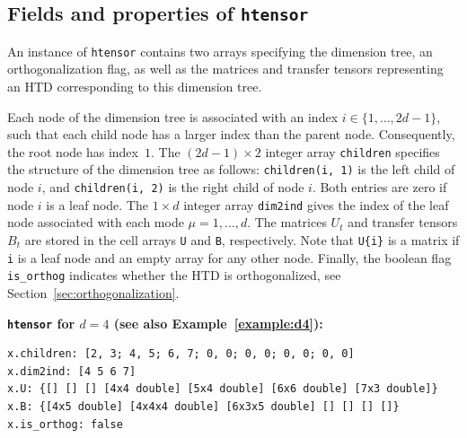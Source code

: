 \documentclass[11pt, a4paper]{article}
\begin{document}
\subsection{Fields and properties of {\tt htensor}} \label{sec:classhtensor}

An instance of {\tt htensor} contains two arrays specifying the dimension tree, an orthogonalization flag,
as well as the matrices and transfer tensors representing an HTD corresponding to
this dimension tree.

Each node of the dimension tree is associated with an index $i \in \{1,\ldots,2d-1\}$, such that each child node 
has a larger index than the parent node.
Consequently, the root node has index~$1$. The $(2d-1)\times 2$ integer array {\tt children}
specifies the structure of the dimension tree as follows: \texttt{children(i, 1)} is the left child of node $i$, and
\texttt{children(i, 2)} is the right child of node $i$. Both entries are zero if node $i$ is a leaf node.
The $1 \times d$ integer array \texttt{dim2ind} gives the index
of the leaf node associated with each mode $\mu=1, \ldots, d$.
The matrices $U_t$ and transfer tensors $B_t$ are stored in the cell
arrays \texttt{U} and \texttt{B}, respectively. Note that \texttt{U\{i\}} is a matrix if
\texttt{i} is a leaf node and an empty array for any other node.
Finally, the boolean flag \texttt{is\_orthog} indicates whether the HTD is
orthogonalized, see Section~\ref{sec:orthogonalization}.
%
\begin{framed}\noindent
\textbf{\texttt{htensor} for $d = 4$ (see also Example~\ref{example:d4}):}\\
\vspace{-3ex} 
\begin{verbatim}
x.children: [2, 3; 4, 5; 6, 7; 0, 0; 0, 0; 0, 0; 0, 0]
x.dim2ind: [4 5 6 7]
x.U: {[] [] [] [4x4 double] [5x4 double] [6x6 double] [7x3 double]}
x.B: {[4x5 double] [4x4x4 double] [6x3x5 double] [] [] [] []}
x.is_orthog: false
\end{verbatim}
\end{framed}
\end{document}
